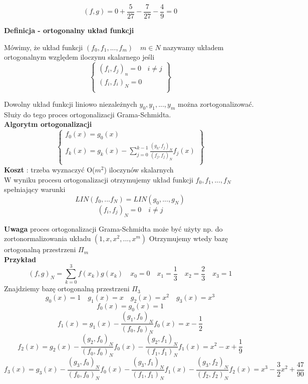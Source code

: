 \documentclass[polish]{kbk}
\begin{document}
$$(f,g) = 0 + \frac{5}{27}  - \frac{7}{27} - \frac{4}{9} = 0 $$


\begin{center}
\textbf{Definicja - ortogonalny układ funkcji}
\end{center}
Mówimy, że układ funkcji \( (f_0, f_1,..., f_m)  \quad m \in N \) nazywamy układem ortogonalnym względem iloczynu skalarnego jeśli
  \[
    \left\{\begin{array}{lr}
        (f_i, f_j)_n = 0 & i \neq j\\
        (f_i, f_i)_N = 0 \\
        \end{array}\right\} 
  \]
  
  Dowolny układ funkcji liniowo niezależnych \( y_0, y_1, ..., y_m\) można zortogonalizować. Służy do tego proces ortogonalizacji Grama-Schmidta.\\
  \textbf{Algorytm ortogonalizacji} \\
    \[
    \left\{\begin{array}{lr}
        f_0(x) = g_0(x) \\
        f_k(x) = g_k(x) -  \sum_{j=0}^{k-1}  \frac { (g_k, f_j)_N } { (f_j, f_j)_N } f_j(x)  \\
        \end{array}\right\} 
  \]
  \textbf{Koszt} : trzeba wyznaczyć O(\(m^2\)) iloczynów skalarnych \\
  
  W wyniku procesu ortogonalizacji otrzymujemy układ funkcji \(f_0, f_1, ... , f_N \) spełniający warunki
  $$ LIN ( f_0, ... f_N ) = LIN ( g_0,...,g_N )  $$
  $$ (f_i, f_j)_N = 0 \quad i \neq j $$
  
  \textbf{Uwaga} proces ortogonalizacji Grama-Schmidta może być użyty np. do zortonormalizowania układu \( (1,x, x^2, ... , x^m) \) Otrzymujemy wtedy bazę ortogonalną przestrzeni \( \Pi_m \) \\
  
  \textbf{Przykład} \\
  
  $$ (f,g)_N =  \sum_{k=0}^{3} f(x_k)g(x_k) \quad x_0 = 0 \quad x_1 = \frac{1}{3} \quad x_2 = \frac{2}{3} \quad x_3 = 1 $$  
  Znajdziemy bazę ortogonalną przestrzeni \( \Pi_3 \) \\
  $$ g_0(x) = 1 \quad g_1(x) = x \quad g_2(x) = x^2 \quad g_3(x) = x^3 $$
  $$ f_0(x) = g_0(x) = 1 $$
  $$ f_1(x) = g_1(x) - \frac{ (g_1, f_0)_N } { (f_0, f_0)_N } f_0(x) = x - \frac{1}{2} $$
  $$ f_2(x) = g_2(x) - \frac{ (g_2, f_0)_N } { (f_0, f_0)_N } f_0(x) -  \frac{ (g_2, f_1)_N } { (f_1, f_1)_N } f_1(x) = x^2 - x + \frac{1}{9} $$
  $$ f_3(x) = g_3(x) - \frac{ (g_3, f_0)_N } { (f_0, f_0)_N } f_0(x) -  \frac{ (g_3, f_1)_N } { (f_1, f_1)_N } f_1(x) -  \frac{ (g_3, f_2)_N } { (f_2, f_2)_N } f_2(x) = x^3 - \frac{ 3} {2}x^2 + \frac{47}{90} $$
\end{document}
